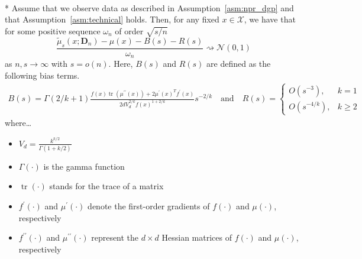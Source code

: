 \begin{boxD}
	\begin{thm}\label{thm:dem2}\mbox{}\\*
		Assume that we observe data as described in Assumption~\ref{asm:npr_dgp} and that Assumption~\ref{asm:technical} holds.
		Then, for any fixed $x \in \mathcal{X}$, we have that for some positive sequence $\omega_n$ of order $\sqrt{s/n}$
		\begin{equation}
			\frac{\tilde{\mu}_{s}(x; \mathbf{D}_n) - \mu(x) - B(s) - R(s)}{\omega_n}
			\rightsquigarrow \mathcal{N}\left(0,1\right)
		\end{equation}
		as $n,s \rightarrow \infty$ with $s = o(n)$.
		Here, $B(s)$ and $R(s)$ are defined as the following bias terms.
		\begin{align}
			B(s)
			= \Gamma(2 / k+1) \frac{f(x) \operatorname{tr}\left(\mu^{\prime \prime}(x)\right)+2 \mu^{\prime}(x)^T f^{\prime}(x)}{2 d V_d^{2 / k} f(x)^{1+2 / k}} s^{-2 / k}
			\quad \text{and} \quad
			R(s) =
			\begin{cases}
				O\left(s^{-3}\right),     & k = 1      \\
				O\left(s^{-4 / k}\right), & k \geq 2
			\end{cases}
		\end{align}
		where\dots
		\begin{multicols}{2}
			\begin{itemize}
				\item $V_d=\frac{k^{k / 2}}{\Gamma(1+k / 2)}$
				\item $\Gamma(\cdot)$ is the gamma function
				\item $\operatorname{tr}(\cdot)$ stands for the trace of a matrix
				\item $f^{\prime}(\cdot)$ and $\mu^{\prime}(\cdot)$ denote the first-order gradients of $f(\cdot)$ and $\mu(\cdot)$, respectively
				\item $f^{\prime \prime}(\cdot)$ and $\mu^{\prime \prime}(\cdot)$ represent the $d \times d$ Hessian matrices of $f(\cdot)$ and $\mu(\cdot)$, respectively
			\end{itemize}
		\end{multicols}
	\end{thm}
\end{boxD}

